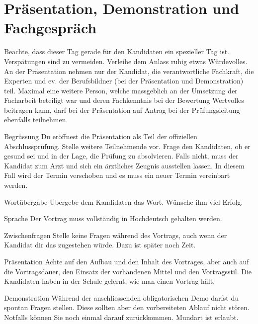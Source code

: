 \section{Präsentation, Demonstration und Fachgespräch}
Beachte, dass dieser Tag gerade für den Kandidaten ein spezieller Tag ist. Verspätungen sind zu vermeiden. Verleihe dem Anlass ruhig etwas Würdevolles. An der Präsentation nehmen nur der Kandidat, die verantwortliche Fachkraft, die Experten und ev. der Berufsbildner (bei der Präsentation und Demonstration) teil. Maximal eine weitere Person, welche massgeblich an der Umsetzung der Facharbeit beteiligt war und deren Fachkenntnis bei der Bewertung Wertvolles beitragen kann, darf bei der Präsentation auf Antrag bei der Prüfungsleitung ebenfalls teilnehmen.

\begin{taskitem}{Begrüssung}
  Du eröffnest die Präsentation als Teil der offiziellen Abschlussprüfung. Stelle weitere Teilnehmende vor. Frage den Kandidaten, ob er gesund sei und in der Lage, die Prüfung zu absolvieren. Falls nicht, muss der Kandidat zum Arzt und sich ein ärztliches Zeugnis ausstellen lassen. In diesem Fall wird der Termin verschoben und es muss ein neuer Termin vereinbart werden.
\end{taskitem}
\begin{taskitemwithoutcomment}{Wortübergabe}
  Übergebe dem Kandidaten das Wort. Wünsche ihm viel Erfolg.
\end{taskitemwithoutcomment}
\begin{taskitem}{Sprache}
  Der Vortrag muss vollständig in Hochdeutsch gehalten werden.
\end{taskitem}
\begin{taskitemwithoutcomment}{Zwischenfragen}
  Stelle keine Fragen während des Vortrags, auch wenn der Kandidat dir das zugestehen würde. Dazu ist später noch Zeit.
\end{taskitemwithoutcomment}
\begin{taskitem}{Präsentation}
  Achte auf den Aufbau und den Inhalt des Vortrages, aber auch auf die Vortragsdauer, den Einsatz der vorhandenen Mittel und den Vortragsstil. Die Kandidaten haben in der Schule gelernt, wie man einen Vortrag hält.
\end{taskitem}
\begin{taskitem}{Demonstration}
  Während der anschliessenden obligatorischen Demo darfst du spontan Fragen stellen. Diese sollten aber den vorbereiteten Ablauf nicht stören. Notfalls können Sie noch einmal darauf zurückkommen. Mundart ist erlaubt.
\end{taskitem}

